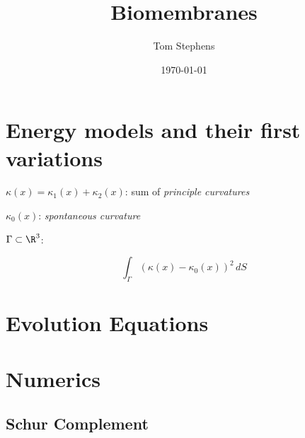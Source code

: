 \documentclass[10pt]{article}
\title{Biomembranes}
\author{Tom Stephens}
\date{ \today}
\begin{document}
\maketitle


\section{Energy models and their first variations}

$\kappa(x) = \kappa_1(x) + \kappa_2(x)$: sum of \emph{principle curvatures}

$\kappa_0(x)$: \emph{spontaneous curvature}

$\Gamma \subset \R^3$: 


\begin{equation}
   \int_{\Gamma} (\kappa(x) - \kappa_{0}(x))^2 \, dS
   \label{eqn:helfrich_energy_no_constraints}
\end{equation}

\cite{DoganNochetto:2012}

\section{Evolution Equations}

\section{Numerics}


\subsection{Schur Complement}







\end{document}
